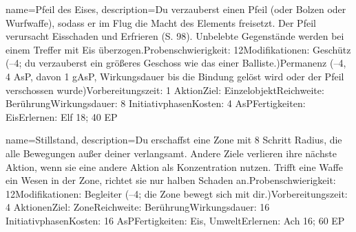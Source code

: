 {
    name={Pfeil des Eises},
    description={Du verzauberst einen Pfeil (oder Bolzen oder Wurfwaffe), sodass er im Flug die Macht des Elements freisetzt. Der Pfeil verursacht Eisschaden und Erfrieren (S. 98). Unbelebte Gegenstände werden bei einem Treffer mit Eis überzogen.\newline Probenschwierigkeit: 12\newline Modifikationen: Geschütz (–4; du verzauberst ein größeres Geschoss wie das einer Balliste.)\newline Permanenz (–4, 4 AsP, davon 1 gAsP, Wirkungsdauer bis die Bindung gelöst wird oder der Pfeil verschossen wurde)\newline Vorbereitungszeit: 1 Aktion\newline Ziel: Einzelobjekt\newline Reichweite: Berührung\newline Wirkungsdauer: 8 Initiativphasen\newline Kosten: 4 AsP\newline Fertigkeiten: Eis\newline Erlernen: Elf 18; 40 EP}
}


{
    name={Stillstand},
    description={Du erschaffst eine Zone mit 8 Schritt Radius, die alle Bewegungen außer deiner verlangsamt. Andere Ziele verlieren ihre nächste Aktion, wenn sie eine andere Aktion als Konzentration nutzen. Trifft eine Waffe ein Wesen in der Zone, richtet sie nur halben Schaden an.\newline Probenschwierigkeit: 12\newline Modifikationen: Begleiter (–4; die Zone bewegt sich mit dir.)\newline Vorbereitungszeit: 4 Aktionen\newline Ziel: Zone\newline Reichweite: Berührung\newline Wirkungsdauer: 16 Initiativphasen\newline Kosten: 16 AsP\newline Fertigkeiten: Eis, Umwelt\newline Erlernen: Ach 16; 60 EP}
}


